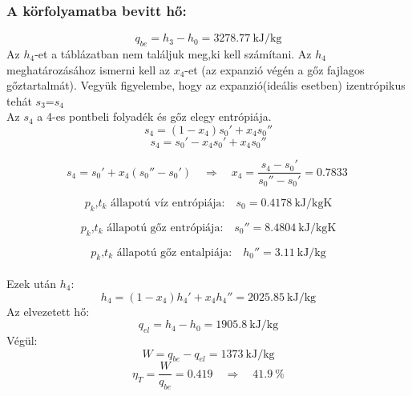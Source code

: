 \subsubsection{A körfolyamatba bevitt hő:}
\begin{equation*}
      q_{be} = {h_3}-{h_0} = \SI{3278.77}{\kilo\joule\per\kilogram}
\end{equation*}
Az $h_4$-et a táblázatban nem találjuk meg,ki kell számítani.
Az $h_4$ meghatározásához ismerni kell az $x_4$-et (az expanzió végén a gőz fajlagos gőztartalmát).
Vegyük figyelembe, hogy az expanzió(ideális esetben) izentrópikus tehát $s_3$=$s_4$ 
\\Az $s_4$ a 4-es pontbeli folyadék és gőz elegy entrópiája.
\begin{equation*}
s_4 = \left (1 - x_4 \right)s_0'+x_4 s_0'' 
\end{equation*}
\begin{equation*}
s_4 = s_0'-x_4 s_0'+x_4 s_0'' 
\end{equation*}

\begin{equation*}
 s_4 =  s_0'+ x_4 \left(s_0'' - s_0' \right)
\quad 
\Rightarrow
\quad 
x_4
= 
\dfrac{s_4 - s_0'}{s_0'' - s_0'} = \SI{0.7833}{}
\end{equation*}

\begin{equation*}
	 \textrm{$p_k$,$t_k$ állapotú víz entrópiája:} 
	 \quad 
	 s_0=\SI{0.4178}{\kilo\joule\per\kilogram\kelvin}
\end{equation*}


\begin{equation*}
	\textrm{$p_k$,$t_k$ állapotú gőz entrópiája:}
	\quad
s_0'' = \SI{8.4804}{\kilo\joule\per\kilogram\kelvin}
\end{equation*}

\begin{equation*}
\textrm{$p_k$,$t_k$ állapotú gőz entalpiája:}
\quad
h_0'' = \SI{3.11}{\kilo\joule\per\kilogram}
\end{equation*}
\\Ezek után $h_4$:
\begin{equation*}
	h_4 =  \left (1 - x_4 \right)h_4'+x_4 h_4''=\SI{2025.85}{\kilo\joule\per\kilogram}
\end{equation*}
Az elvezetett hő:
\begin{equation*}
	q_{el} =h_4 - h_0 =
	\SI{1905.8}{\kilo\joule\per\kilogram} 
\end{equation*}
Végül:
\begin{equation*}
	W={q_{be}} - {q_{el}} =
	\SI{1373}{\kilo\joule\per\kilogram} 
\end{equation*}
\begin{equation*}
	\eta_T=\dfrac{W} {q_{be}}=
	\SI{0.419}
	\quad
	\Rightarrow
	\quad
	\SI{41.9}{\%}
\end{equation*}
